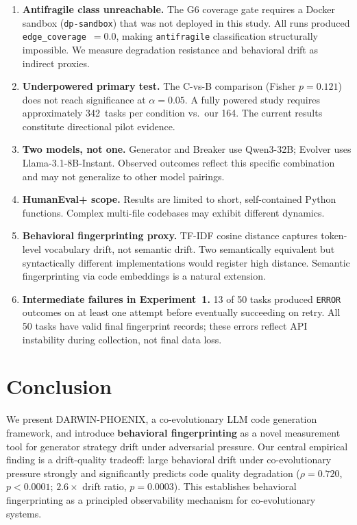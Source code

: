 \documentclass[11pt,letterpaper]{article}
\begin{document}
\begin{enumerate}

\item \textbf{Antifragile class unreachable.}
The G6 coverage gate requires a Docker sandbox (\texttt{dp-sandbox}) that was
not deployed in this study. All runs produced \texttt{edge\_coverage}~$= 0.0$,
making \texttt{antifragile} classification structurally impossible. We measure
degradation resistance and behavioral drift as indirect proxies.

\item \textbf{Underpowered primary test.}
The C-vs-B comparison (Fisher $p = 0.121$) does not reach significance at
$\alpha = 0.05$. A fully powered study requires approximately 342~tasks per
condition vs.\ our 164. The current results constitute directional pilot
evidence.

\item \textbf{Two models, not one.}
Generator and Breaker use Qwen3-32B; Evolver uses Llama-3.1-8B-Instant.
Observed outcomes reflect this specific combination and may not generalize to
other model pairings.

\item \textbf{HumanEval+ scope.}
Results are limited to short, self-contained Python functions. Complex
multi-file codebases may exhibit different dynamics.

\item \textbf{Behavioral fingerprinting proxy.}
TF-IDF cosine distance captures token-level vocabulary drift, not semantic
drift. Two semantically equivalent but syntactically different implementations
would register high distance. Semantic fingerprinting via code embeddings is a
natural extension.

\item \textbf{Intermediate failures in Experiment~1.}
13 of 50 tasks produced \texttt{ERROR} outcomes on at least one attempt before
eventually succeeding on retry. All 50 tasks have valid final fingerprint
records; these errors reflect API instability during collection, not final data
loss.

\end{enumerate}

\section{Conclusion}

We present DARWIN-PHOENIX, a co-evolutionary LLM code generation framework, and
introduce \textbf{behavioral fingerprinting} as a novel measurement tool for
generator strategy drift under adversarial pressure. Our central empirical
finding is a drift-quality tradeoff: large behavioral drift under co-evolutionary
pressure strongly and significantly predicts code quality degradation
($\rho = 0.720$, $p < 0.0001$; $2.6\times$ drift ratio, $p = 0.0003$). This
establishes behavioral fingerprinting as a principled observability mechanism for
co-evolutionary systems.
\end{document}

